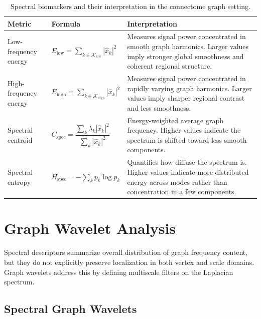 \begin{table}[H]
    \centering
    \caption{Spectral biomarkers and their interpretation in the connectome graph setting.}
    \label{tab:spectral_metrics_interpretation} %
    \begin{tabular}{p{3.0cm} p{4.3cm} p{7.0cm}}
        \toprule
        \textbf{Metric} & \textbf{Formula} & \textbf{Interpretation} \\
        \midrule
        Low-frequency energy &
        \(E_{\mathrm{low}}=\sum_{k\in\mathcal{K}_{\mathrm{low}}} |\hat x_k|^2\) &
        Measures signal power concentrated in smooth graph harmonics. Larger values imply stronger global smoothness and coherent regional structure. \\
        \addlinespace
        High-frequency energy &
        \(E_{\mathrm{high}}=\sum_{k\in\mathcal{K}_{\mathrm{high}}} |\hat x_k|^2\) &
        Measures signal power concentrated in rapidly varying graph harmonics. Larger values imply sharper regional contrast and less smoothness. \\
        \addlinespace
        Spectral centroid &
        \(C_{\mathrm{spec}}=\dfrac{\sum_k \lambda_k |\hat x_k|^2}{\sum_k |\hat x_k|^2}\) &
        Energy-weighted average graph frequency. Higher values indicate the spectrum is shifted toward less smooth components. \\
        \addlinespace
        Spectral entropy &
        \(H_{\mathrm{spec}}=-\sum_k p_k\log p_k\) &
        Quantifies how diffuse the spectrum is. Higher values indicate more distributed energy across modes rather than concentration in a few components. \\
        \bottomrule
    \end{tabular}
\end{table}

\section{Graph Wavelet Analysis}
\label{sec:ch4_wavelets} %

Spectral descriptors summarize overall distribution of graph frequency content, but they do not explicitly preserve localization in both vertex and scale domains. Graph wavelets address this by defining multiscale filters on the Laplacian spectrum.

\subsection{Spectral Graph Wavelets}

